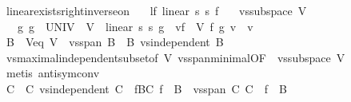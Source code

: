 \begin{isabellebody}
\ linear{\isacharunderscore}{\kern0pt}exists{\isacharunderscore}{\kern0pt}right{\isacharunderscore}{\kern0pt}inverse{\isacharunderscore}{\kern0pt}on{\isacharcolon}{\kern0pt}\isanewline
\ \ \ lf{\isacharcolon}{\kern0pt}\ {\isachardoublequoteopen}linear\ s{}\ s{}\ f{\isachardoublequoteclose}\isanewline
\ \ \ {\isachardoublequoteopen}vs{}{\isachardot}{\kern0pt}subspace\ V{\isachardoublequoteclose}\isanewline
\ \ \ {\isachardoublequoteopen}{\isasymexists}g{\isachardot}{\kern0pt}\ g\ {\isacharbackquote}{\kern0pt}\ UNIV\ {\isasymsubseteq}\ V\ {\isasymand}\ linear\ s{}\ s{}\ g\ {\isasymand}\ {\isacharparenleft}{\kern0pt}{\isasymforall}v{\isasymin}f\ {\isacharbackquote}{\kern0pt}\ V{\isachardot}{\kern0pt}\ f\ {\isacharparenleft}{\kern0pt}g\ v{\isacharparenright}{\kern0pt}\ {\isacharequal}{\kern0pt}\ v{\isacharparenright}{\kern0pt}{\isachardoublequoteclose}\isanewline
%
\isadelimproof
%
\endisadelimproof
%
\isatagproof
{}\isamarkupfalse%
\ {\isacharminus}{\kern0pt}\isanewline
\ \ \isamarkupfalse%
\ B\ \ V{\isacharunderscore}{\kern0pt}eq{\isacharcolon}{\kern0pt}\ {\isachardoublequoteopen}V\ {\isacharequal}{\kern0pt}\ vs{}{\isachardot}{\kern0pt}span\ B{\isachardoublequoteclose}\ \ B{\isacharcolon}{\kern0pt}\ {\isachardoublequoteopen}vs{}{\isachardot}{\kern0pt}independent\ B{\isachardoublequoteclose}\isanewline
\ \ \ \ \isamarkupfalse%
\ vs{}{\isachardot}{\kern0pt}maximal{\isacharunderscore}{\kern0pt}independent{\isacharunderscore}{\kern0pt}subset{\isacharbrackleft}{\kern0pt}of\ V{\isacharbrackright}{\kern0pt}\ vs{}{\isachardot}{\kern0pt}span{\isacharunderscore}{\kern0pt}minimal{\isacharbrackleft}{\kern0pt}OF\ {\isacharunderscore}{\kern0pt}\ {\isacartoucheopen}vs{}{\isachardot}{\kern0pt}subspace\ V{\isacartoucheclose}{\isacharbrackright}{\kern0pt}\isanewline
\ \ \ \ \isamarkupfalse%
\ {\isacharparenleft}{\kern0pt}metis\ antisym{\isacharunderscore}{\kern0pt}conv{\isacharparenright}{\kern0pt}\isanewline
\ \ \isamarkupfalse%
\ C\ \ C{\isacharcolon}{\kern0pt}\ {\isachardoublequoteopen}vs{}{\isachardot}{\kern0pt}independent\ C{\isachardoublequoteclose}\ \ fB{\isacharunderscore}{\kern0pt}C{\isacharcolon}{\kern0pt}\ {\isachardoublequoteopen}f\ {\isacharbackquote}{\kern0pt}\ B\ {\isasymsubseteq}\ vs{}{\isachardot}{\kern0pt}span\ C{\isachardoublequoteclose}\ {\isachardoublequoteopen}C\ {\isasymsubseteq}\ f\ {\isacharbackquote}{\kern0pt}\ B{\isachardoublequoteclose}\isanewline

\end{isabellebody}
